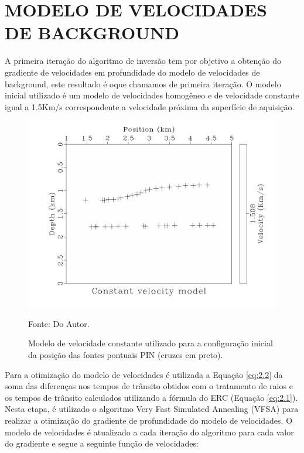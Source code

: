 \chapter{MODELO DE VELOCIDADES DE BACKGROUND}
\label{cap3}

A primeira iteração do algoritmo de inversão tem por objetivo a obtenção do gradiente de
velocidades em profundidade do modelo de velocidades de background, este resultado é oque
chamamos de primeira iteração. O modelo inicial utilizado é um modelo de velocidades homogêneo
e de velocidade constante igual a 1.5Km/s correspondente a velocidade próxima da superfície de aquisição. 

\begin{figure}[H]
\caption{Modelo de velocidade constante utilizado para a configuração inicial da
posição das fontes pontuais PIN (cruzes em preto).}
\begin{center}
\includegraphics[scale=0.3]{images/ctevel.jpeg}
\vspace{-0.3cm}
\end{center}
\begin{center}
 Fonte: Do Autor.
\end{center}
\label{fig:3.1}
\end{figure}


Para a otimização do modelo de velocidades é utilizada a Equação \ref{eq:2.2} da soma das
diferenças nos tempos de trânsito obtidos com o tratamento de raios e os tempos de trânsito calculados utilizando a fórmula do ERC (Equação \ref{eq:2.1}). Nesta etapa, é utilizado o algoritmo Very Fast Simulated Annealing (VFSA) para realizar a otimização do gradiente de profundidade do modelo de velocidades. O modelo de velocidades é atualizado a cada iteração do algoritmo para cada valor do gradiente e segue a seguinte função de velocidades:

